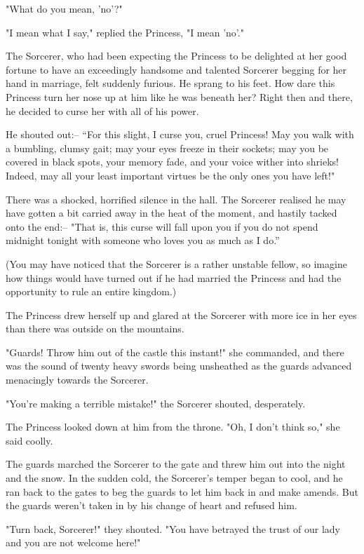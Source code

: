 "What do you mean, 'no'?" 

"I mean what I say," replied the Princess, "I mean 'no'." 

The Sorcerer, who had been expecting the Princess to be delighted at her good fortune to have an exceedingly handsome and talented Sorcerer begging for her hand in marriage, felt suddenly furious. He sprang to his feet. How dare this Princess turn her nose up at him like he was beneath her? Right then and there, he decided to curse her with all of his power. 

He shouted out:– “For this slight, I curse you, cruel Princess! May you walk with a bumbling, clumsy gait; may your eyes freeze in their sockets; may you be covered in black spots, your memory fade, and your voice wither into shrieks! Indeed, may all your least important virtues be the only ones you have left!" 

There was a shocked, horrified silence in the hall. The Sorcerer realised he may have gotten a bit carried away in the heat of the moment, and hastily tacked onto the end:–  "That is, this curse will fall upon you if you do not spend midnight tonight with someone who loves you as much as I do.” 

(You may have noticed that the Sorcerer is a rather unstable fellow, so imagine how things would have turned out if he had married the Princess and had the opportunity to rule an entire kingdom.)

The Princess drew herself up and glared at the Sorcerer with more ice in her eyes than there was outside on the mountains. 

"Guards! Throw him out of the castle this instant!" she commanded, and there was the sound of twenty heavy swords being unsheathed as the guards advanced menacingly towards the Sorcerer. 

"You're making a terrible mistake!" the Sorcerer shouted, desperately.

The Princess looked down at him from the throne. "Oh, I don't think so," she said coolly. 

The guards marched the Sorcerer to the gate and threw him out into the night and the snow. In the sudden cold, the Sorcerer's temper began to cool, and he ran back to the gates to beg the guards to let him back in and make amends. But the guards weren't taken in by his change of heart and refused him. 

"Turn back, Sorcerer!" they shouted. "You have betrayed the trust of our lady and you are not welcome here!" 

